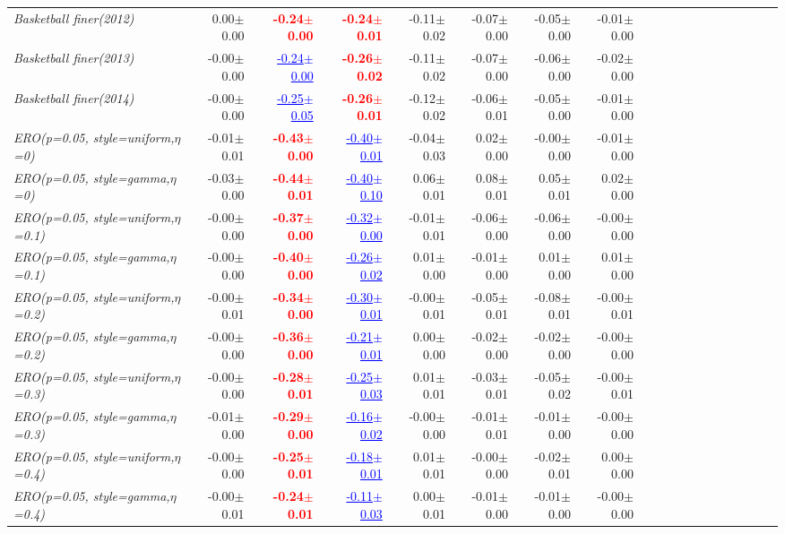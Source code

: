 \documentclass[nohyperref]{article}
\theoremstyle{plain}
\theoremstyle{definition}
\theoremstyle{remark}
\newcommand{\red}[1]{\textcolor{red}{\textbf{#1}}}
\newcommand{\blue}[1]{\textcolor{blue}{\underline{#1}}}
\begin{document}
\begin{table*}[!ht]
{\begin{tabular}{lrrrrrrrrrrrrrrrrrr}
			{\it Basketball finer(2012)} & 0.00$\pm$0.00 & \red{-0.24$\pm$0.00} & \red{-0.24$\pm$0.01} & -0.11$\pm$0.02 & -0.07$\pm$0.00 & -0.05$\pm$0.00 & -0.01$\pm$0.00 \\
			{\it Basketball finer(2013)} & -0.00$\pm$0.00 & \blue{-0.24$\pm$0.00} & \red{-0.26$\pm$0.02} & -0.11$\pm$0.02 & -0.07$\pm$0.00 & -0.06$\pm$0.00 & -0.02$\pm$0.00 \\
			{\it Basketball finer(2014)} & -0.00$\pm$0.00 & \blue{-0.25$\pm$0.05} & \red{-0.26$\pm$0.01} & -0.12$\pm$0.02 & -0.06$\pm$0.01 & -0.05$\pm$0.00 & -0.01$\pm$0.00 \\
			{\it ERO(p=0.05, style=uniform,$\eta$=0)} & -0.01$\pm$0.01 & \red{-0.43$\pm$0.00} & \blue{-0.40$\pm$0.01} & -0.04$\pm$0.03 & 0.02$\pm$0.00 & -0.00$\pm$0.00 & -0.01$\pm$0.00 \\
			{\it ERO(p=0.05, style=gamma,$\eta$=0)} & -0.03$\pm$0.00 & \red{-0.44$\pm$0.01} & \blue{-0.40$\pm$0.10} & 0.06$\pm$0.01 & 0.08$\pm$0.01 & 0.05$\pm$0.01 & 0.02$\pm$0.00 \\
			{\it ERO(p=0.05, style=uniform,$\eta$=0.1)} & -0.00$\pm$0.00 & \red{-0.37$\pm$0.00} & \blue{-0.32$\pm$0.00} & -0.01$\pm$0.01 & -0.06$\pm$0.00 & -0.06$\pm$0.00 & -0.00$\pm$0.00 \\
			{\it ERO(p=0.05, style=gamma,$\eta$=0.1)} & -0.00$\pm$0.00 & \red{-0.40$\pm$0.00} & \blue{-0.26$\pm$0.02} & 0.01$\pm$0.00 & -0.01$\pm$0.00 & 0.01$\pm$0.00 & 0.01$\pm$0.00 \\
			{\it ERO(p=0.05, style=uniform,$\eta$=0.2)} & -0.00$\pm$0.01 & \red{-0.34$\pm$0.00} & \blue{-0.30$\pm$0.01} & -0.00$\pm$0.01 & -0.05$\pm$0.01 & -0.08$\pm$0.01 & -0.00$\pm$0.01 \\
			{\it ERO(p=0.05, style=gamma,$\eta$=0.2)} & -0.00$\pm$0.00 & \red{-0.36$\pm$0.00} & \blue{-0.21$\pm$0.01} & 0.00$\pm$0.00 & -0.02$\pm$0.00 & -0.02$\pm$0.00 & -0.00$\pm$0.00 \\
			{\it ERO(p=0.05, style=uniform,$\eta$=0.3)} & -0.00$\pm$0.00 & \red{-0.28$\pm$0.01} & \blue{-0.25$\pm$0.03} & 0.01$\pm$0.01 & -0.03$\pm$0.01 & -0.05$\pm$0.02 & -0.00$\pm$0.01 \\
			{\it ERO(p=0.05, style=gamma,$\eta$=0.3)} & -0.01$\pm$0.00 & \red{-0.29$\pm$0.00} & \blue{-0.16$\pm$0.02} & -0.00$\pm$0.00 & -0.01$\pm$0.01 & -0.01$\pm$0.00 & -0.00$\pm$0.00 \\
			{\it ERO(p=0.05, style=uniform,$\eta$=0.4)} & -0.00$\pm$0.00 & \red{-0.25$\pm$0.01} & \blue{-0.18$\pm$0.01} & 0.01$\pm$0.01 & -0.00$\pm$0.00 & -0.02$\pm$0.01 & 0.00$\pm$0.00 \\
			{\it ERO(p=0.05, style=gamma,$\eta$=0.4)} & -0.00$\pm$0.01 & \red{-0.24$\pm$0.01} & \blue{-0.11$\pm$0.03} & 0.00$\pm$0.01 & -0.01$\pm$0.00 & -0.01$\pm$0.00 & -0.00$\pm$0.00 \\

\end{tabular}}
\end{table*}
\end{document}
